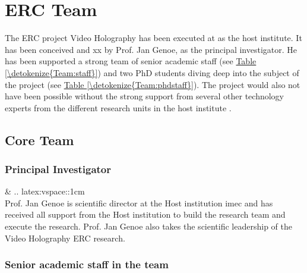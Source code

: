 \documentclass[a4paper,10pt,english,openany,oneside]{jupyterBook}
\begin{document}
\chapter{ERC Team}
\label{\detokenize{Team:erc-team}}\label{\detokenize{Team::doc}}
\sphinxAtStartPar
The ERC project Video Holography has been executed at  as the host institute. It has been conceived and xx by Prof. Jan Genoe, as the principal investigator. He has been supported a strong team of senior academic staff (see \hyperref[\detokenize{Team:staff}]{Table \ref{\detokenize{Team:staff}}}) and two PhD students diving deep into the subject of the project (see \hyperref[\detokenize{Team:phdstaff}]{Table \ref{\detokenize{Team:phdstaff}}}). The project would also not have been possible without the strong support from several other technology experts from the different research units in the host institute .


\section{Core Team}
\label{\detokenize{Team:core-team}}

\subsection{Principal Investigator}
\label{\detokenize{Team:principal-investigator}}

\begin{savenotes}\sphinxattablestart
\sphinxthistablewithglobalstyle
\centering
\begin{tabular}[t]{}
\sphinxtoprule
\sphinxtableatstartofbodyhook
\sphinxAtStartPar
{}
&
\sphinxAtStartPar
.. latex:vspace::\sphinxhyphen{}1cm\\
Prof. Jan Genoe is scientific director at the Host institution imec and has received all support from the Host institution to build the research team and execute the research. Prof. Jan Genoe also takes the scientific leadership of the Video Holography ERC research.
\\
\sphinxbottomrule
\end{tabular}
\sphinxtableafterendhook\par
\sphinxattableend\end{savenotes}


\subsection{Senior academic staff in the team}
\label{\detokenize{Team:senior-academic-staff-in-the-team}}
\end{document}
